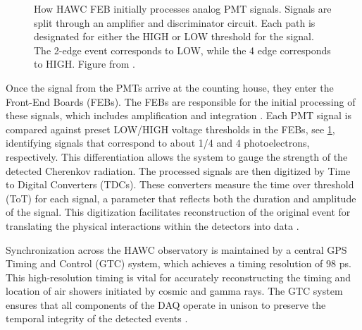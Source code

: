 \begin{figure}
    \caption{How HAWC FEB initially processes analog PMT signals. Signals are split through an amplifier and discriminator circuit. Each path is designated for either the HIGH or LOW threshold for the signal. The 2-edge event corresponds to LOW, while the 4 edge corresponds to HIGH. Figure from \cite{HAWC_DAQ_NIM}.}
    \label{fig:tot_threholds}
\end{figure}

Once the signal from the PMTs arrive at the counting house, they enter the Front-End Boards (FEBs).
The FEBs are responsible for the initial processing of these signals, which includes amplification and integration \cite{Milagro_DAQ}.
Each PMT signal is compared against preset LOW/HIGH voltage thresholds in the FEBs, see \cref{fig:tot_threholds}, identifying signals that correspond to about 1/4 and 4 photoelectrons, respectively.
This differentiation allows the system to gauge the strength of the detected Cherenkov radiation.
The processed signals are then digitized by Time to Digital Converters (TDCs).
These converters measure the time over threshold (ToT) for each signal, a parameter that reflects both the duration and amplitude of the signal.
This digitization facilitates reconstruction of the original event for translating the physical interactions within the detectors into data \cite{HAWC_NIM,HAWC_DAQ_NIM,Milagro_DAQ}.

Synchronization across the HAWC observatory is maintained by a central GPS Timing and Control (GTC) system, which achieves a timing resolution of 98 ps.
This high-resolution timing is vital for accurately reconstructing the timing and location of air showers initiated by cosmic and gamma rays.
The GTC system ensures that all components of the DAQ operate in unison to preserve the temporal integrity of the detected events \cite{HAWC_NIM,hawc_daq_thesis}.

